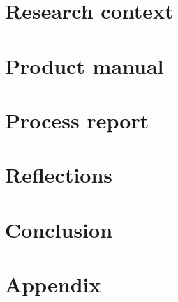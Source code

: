 \documentclass[a4paper,11pt]{report}
\begin{document}
\chapter{Research context}


\chapter{Product manual}


\chapter{Process report}


\chapter{Reflections}



\chapter*{Conclusion}


\appendix
\chapter{Appendix}

\end{document}
